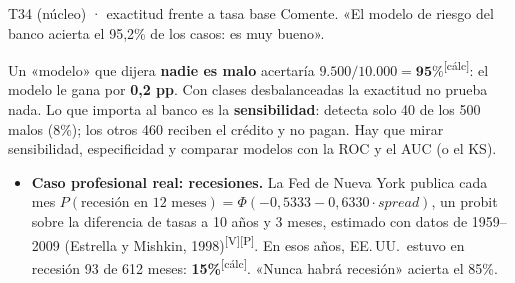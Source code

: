 \documentclass[10pt,a4paper]{article}
\newcommand{\V}{\textsuperscript{\textcolor{green!45!black}{[V]}}}
\newcommand{\Pre}{\textsuperscript{\textcolor{orange!80!black}{[P]}}}
\newcommand{\calc}{\textsuperscript{\textcolor{blue!60!black}{[cálc]}}}
\begin{document}
\begin{enun}{T34 (núcleo) · exactitud frente a tasa base}
Comente. «El modelo de riesgo del banco acierta el 95,2\% de los casos: es muy bueno».
\end{enun}
\begin{ejemplar}
Un «modelo» que dijera \textbf{nadie es malo} acertaría $9.500/10.000=\mathbf{95\%}$\calc: el modelo le gana por \textbf{0,2 pp}. Con clases desbalanceadas la exactitud no prueba nada. Lo que importa al banco es la \textbf{sensibilidad}: detecta solo 40 de los 500 malos (8\%); los otros 460 reciben el crédito y no pagan. Hay que mirar sensibilidad, especificidad y comparar modelos con la ROC y el AUC (o el KS).
\end{ejemplar}
\begin{trampa}
\begin{itemize}[leftmargin=*,itemsep=0pt,topsep=0pt]
\item \textbf{Caso profesional real: recesiones.} La Fed de Nueva York publica cada mes $P(\text{recesión en 12 meses})=\Phi(-0{,}5333-0{,}6330\cdot spread)$, un probit sobre la diferencia de tasas a 10 años y 3 meses, estimado con datos de 1959--2009 (Estrella y Mishkin, 1998)\V\Pre. En esos años, EE.\,UU.\ estuvo en recesión 93 de 612 meses: \textbf{15\%}\calc. «Nunca habrá recesión» acierta el 85\%.
\end{itemize}
\end{trampa}
\end{document}
